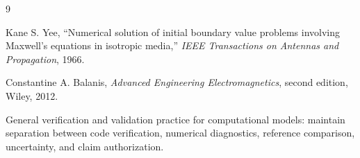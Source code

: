 \documentclass[11pt,a4paper]{article}
\begin{document}
\begin{thebibliography}{9}

Kane S. Yee, ``Numerical solution of initial boundary value problems involving Maxwell's equations in isotropic media,'' \emph{IEEE Transactions on Antennas and Propagation}, 1966.

Constantine A. Balanis, \emph{Advanced Engineering Electromagnetics}, second edition, Wiley, 2012.

General verification and validation practice for computational models: maintain separation between code verification, numerical diagnostics, reference comparison, uncertainty, and claim authorization.

\end{thebibliography}
\end{document}

